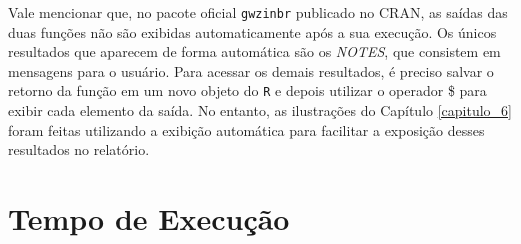 \documentclass[12pt, a4paper, twoside]{report}
\numberwithin{equation}{section} %
\begin{document}
\begin{table}[!htb]
\label{tab:outfuncR2}
\end{table}

Vale mencionar que, no pacote oficial \texttt{gwzinbr} publicado no CRAN, as saídas das duas funções não são exibidas automaticamente após a sua execução. Os únicos resultados que aparecem de forma automática são os \textit{NOTES}, que consistem em mensagens para o usuário. Para acessar os demais resultados, é preciso salvar o retorno da função em um novo objeto do \texttt{R} e depois utilizar o operador \$ para exibir cada elemento da saída. No entanto, as ilustrações do Capítulo \ref{capitulo_6} foram feitas utilizando a exibição automática para facilitar a exposição desses resultados no relatório.

\section{Tempo de Execução}
\end{document}
